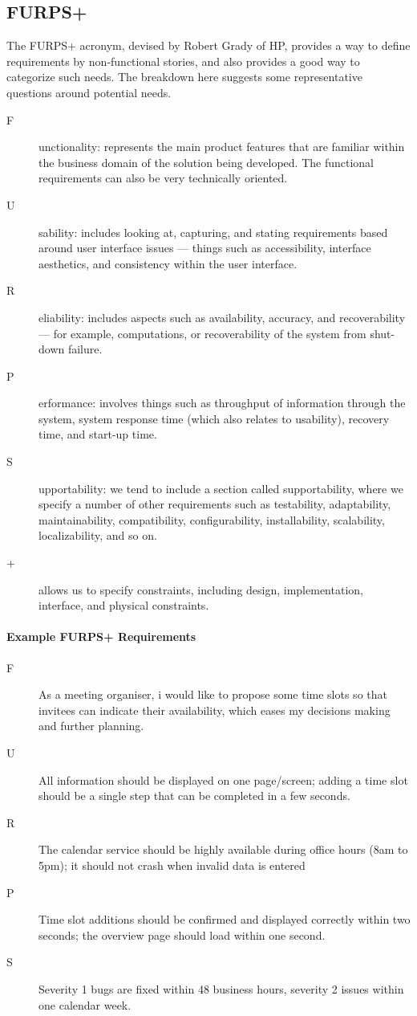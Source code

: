 \subsection{FURPS+}
The FURPS+ acronym, devised by Robert Grady of HP, provides a way to define requirements by non-functional stories, and also provides a good way to categorize such needs. The breakdown here suggests some representative questions around potential needs.

\begin{description}
	\item [F]unctionality: represents the main product features that are familiar within the business domain of the solution being developed. The functional requirements can also be very technically oriented.
	\item [U]sability: includes looking at, capturing, and stating requirements based around user interface issues — things such as accessibility, interface aesthetics, and consistency within the user interface.
	\item [R]eliability: includes aspects such as availability, accuracy, and recoverability — for example, computations, or recoverability of the system from shut-down failure.
	\item [P]erformance: involves things such as throughput of information through the system, system response time (which also relates to usability), recovery time, and start-up time.
	\item [S]upportability: we tend to include a section called supportability, where we specify a number of other requirements such as testability, adaptability, maintainability, compatibility, configurability, installability, scalability, localizability, and so on.
	\item [+] allows us to specify constraints, including design, implementation, interface, and physical constraints.
\end{description}

\paragraph{Example FURPS+ Requirements}
\begin{description}
	\item [F] As a meeting organiser, i would like to propose some time slots so that invitees can indicate their availability, which eases my decisions making and further planning.
	\item [U] All information should be displayed on one page/screen; adding a time slot should be a single step that can be completed in a few seconds.
	\item [R] The calendar service should be highly available during office hours (8am to 5pm); it should not crash when invalid data is entered
	\item [P] Time slot additions should be confirmed and displayed correctly within two seconds; the overview page should load within one second. 
	\item [S] Severity 1 bugs are fixed within 48 business hours, severity 2 issues within one calendar week.
\end{description}
